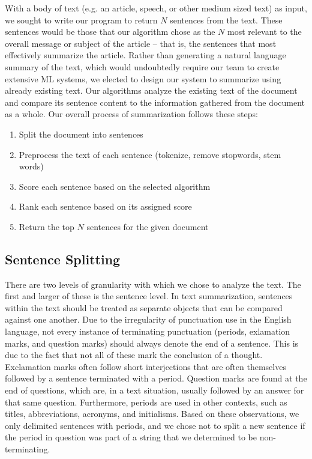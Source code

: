 \documentclass[11pt,a4paper]{article}
\begin{document}
  With a body of text (e.g. an article, speech, or other medium sized text) as input, we sought to write our program to return $N$ sentences from the text. These sentences would be those that our algorithm chose as the $N$ most relevant to the overall message or subject of the article – that is, the sentences that most effectively summarize the article. Rather than generating a natural language summary of the text, which would undoubtedly require our team to create extensive ML systems, we elected to design our system to summarize using already existing text. Our algorithms analyze the existing text of the document and compare its sentence content to the information gathered from the document as a whole. Our overall process of summarization follows these steps:
  \begin{enumerate}
    \item Split the document into sentences
      \item Preprocess the text of each sentence (tokenize, remove stopwords, stem words)
      \item Score each sentence based on the selected algorithm
      \item Rank each sentence based on its assigned score
      \item Return the top $N$ sentences for the given document
  \end{enumerate}

  \subsection{Sentence Splitting}

  There are two levels of granularity with which we chose to analyze the text. The first and larger of these is the sentence level. In text summarization, sentences within the text should be treated as separate objects that can be compared against one another. Due to the irregularity of punctuation use in the English language, not every instance of terminating punctuation (periods, exlamation marks, and question marks) should always denote the end of a sentence. This is due to the fact that not all of these mark the conclusion of a thought. Exclamation marks often follow short interjections that are often themselves followed by a sentence terminated with a period. Question marks are found at the end of questions, which are, in a text situation, usually followed by an answer for that same question. Furthermore, periods are used in other contexts, such as titles, abbreviations, acronyms, and initialisms. Based on these observations, we only delimited sentences with periods, and we chose not to split a new sentence if the period in question was part of a string that we determined to be non-terminating.
\end{document}
